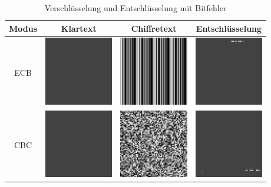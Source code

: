 \begin{table}
    \begin{center}
        \begin{tabular}{|c|c|c|c|}
        \hline
        Modus & Klartext & Chiffretext & Entschlüsselung \\
        \hline
        ECB &
        \includegraphics[width=3cm]{img/error/original} &
        \includegraphics[width=3cm]{img/error/output_ECM} &
        \includegraphics[width=3cm]{img/error/output_ECM_decrypt} \\
        \hline
        CBC &
        \includegraphics[width=3cm]{img/error/original} &
        \includegraphics[width=3cm]{img/error/output_CBC} &
        \includegraphics[width=3cm]{img/error/output_CBC_decrypt} \\
        \hline
        \end{tabular}   
    \end{center}
    \caption{Verschlüsselung und Entschlüsselung mit Bitfehler}
    \label{tab:biterror}
\end{table}
\newpage
